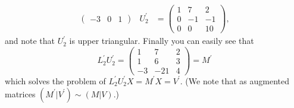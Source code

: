{\begin{align*}
\begin{pmatrix}
-3 & 0 & 1
\end{pmatrix}
& U_2^{\prime} & = \begin{pmatrix}
1 & 7 & 2 \\
0 & -1 & -1 \\
0 & 0 & 10
\end{pmatrix},
\end{align*}
and note that $U_2^{\prime}$ is upper triangular. Finally you can easily see that
\[
L_2^{\prime} U_2^{\prime} = \begin{pmatrix}
1 & 7 & 2 \\
1 & 6 & 3 \\
-3 & -21 & 4
\end{pmatrix} = M^{\prime}
\]
which solves the problem of $L_2^{\prime} U_2^{\prime} X = M^{\prime} X = V^{\prime}$. (We note that as augmented matrices $( M^{\prime} | V^{\prime} ) \sim (M | V)$.)

} %

